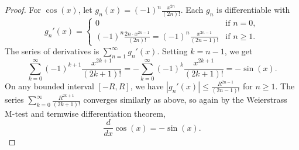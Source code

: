 \begin{proof}
    For $\cos(x)$, let $g_n(x) = (-1)^n \frac{x^{2n}}{(2n)!}$. Each $g_n$ is differentiable with
    $$g_n'(x) = \begin{cases} 0 & \text{if } n = 0, \\ (-1)^n \frac{2n \cdot x^{2n-1}}{(2n)!} = (-1)^n \frac{x^{2n-1}}{(2n-1)!} & \text{if } n \geq 1. \end{cases}$$
    The series of derivatives is $\sum_{n=1}^\infty g_n'(x)$. Setting $k = n-1$, we get
    $$\sum_{k=0}^\infty (-1)^{k+1} \frac{x^{2k+1}}{(2k+1)!} = -\sum_{k=0}^\infty (-1)^k \frac{x^{2k+1}}{(2k+1)!} = -\sin(x).$$
    On any bounded interval $[-R, R]$, we have $|g_n'(x)| \leq \frac{R^{2n-1}}{(2n-1)!}$ for $n \geq 1$. The series $\sum_{k=0}^\infty \frac{R^{2k+1}}{(2k+1)!}$ converges similarly as above, so again by the Weierstrass M-test and termwise differentiation theorem,
    $$\frac{d}{dx} \cos(x) = -\sin(x).$$
\end{proof}
